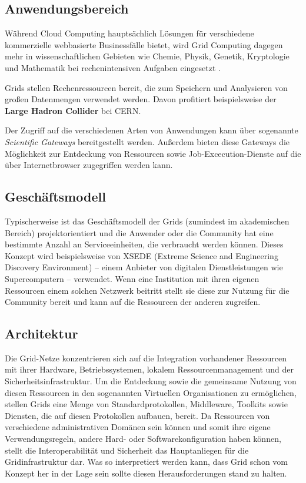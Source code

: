 \subsection{Anwendungsbereich}
Während Cloud Computing hauptsächlich Lösungen für verschiedene kommerzielle webbasierte Businessfälle bietet, wird Grid Computing dagegen mehr in wissenschaftlichen Gebieten wie Chemie, Physik, Genetik, Kryptologie und Mathematik bei rechenintensiven Aufgaben eingesetzt \cite{5623257}.

Grids stellen Rechenressourcen bereit, die zum Speichern und Analysieren von großen Datenmengen verwendet werden. Davon profitiert beispielsweise der \textbf{Large Hadron Collider} bei CERN.\cite{wlcg}

Der Zugriff auf die verschiedenen Arten von Anwendungen kann über sogenannte \textit{Scientific Gateways} bereitgestellt werden. Außerdem bieten diese Gateways die Möglichkeit zur Entdeckung von Ressourcen sowie Job-Excecution-Dienste auf die über Internetbrowser zugegriffen werden kann\cite{360-degree-compared}.

\subsection{Geschäftsmodell}
Typischerweise ist das Geschäftsmodell der Grids (zumindest im akademischen Bereich) projektorientiert und die Anwender oder die Community hat eine bestimmte Anzahl an Serviceeinheiten, die verbraucht werden können\cite{360-degree-compared}.  
Dieses Konzept wird beispielsweise von XSEDE (Extreme Science and Engineering Discovery Environment) -- einem Anbieter von digitalen Dienstleistungen wie Supercomputern -- verwendet\cite{xsede}.
Wenn eine Institution mit ihren eigenen Ressourcen einem solchen Netzwerk beitritt stellt sie diese zur Nutzung für die Community bereit und kann auf die Ressourcen der anderen zugreifen\cite{360-degree-compared}.

\subsection{Architektur}
Die Grid-Netze konzentrieren sich auf die Integration vorhandener Ressourcen mit ihrer Hardware, Betriebssystemen, lokalem Ressourcenmanagement und der Sicherheitsinfrastruktur.
Um die Entdeckung sowie die gemeinsame Nutzung von diesen Ressourcen in den sogenannten \glqq Virtuellen Organisationen\grqq{} zu ermöglichen, stellen Grids eine Menge von Standardprotokollen, Middleware, Toolkits sowie Diensten, die auf diesen Protokollen aufbauen, bereit.
Da Ressourcen von verschiedene administrativen Domänen sein können und somit ihre eigene Verwendungsregeln, andere Hard- oder Softwarekonfiguration haben können, stellt die Interoperabilität und Sicherheit das Hauptanliegen für die Gridinfrastruktur dar.\cite{360-degree-compared}
Was so interpretiert werden kann, dass Grid schon vom Konzept her in der Lage sein sollte diesen Herausforderungen stand zu halten.

